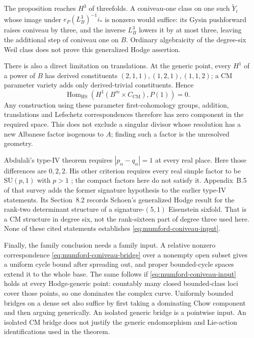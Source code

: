 \documentclass[11pt]{article}
\theoremstyle{definition}
\theoremstyle{remark}
\begin{document}
The proposition reaches $H^3$ of threefolds.  A coniveau-one class
on one such $\widetilde Y_i$ whose image under
$e_P(L_B^3)^{-1}i_*$ is nonzero would suffice: its Gysin
pushforward raises coniveau by three, and the inverse $L_B^3$
lowers it by at most three, leaving the additional step of
coniveau one on $B$.  Ordinary algebraicity of the degree-six
Weil class does not prove this generalized Hodge assertion.

There is also a direct limitation on translations.  At the generic
point, every $H^1$ of a power of $B$ has derived constituents
$(2,1,1),(1,2,1),(1,1,2)$; a CM parameter variety adds only
derived-trivial constituents.  Hence
\[
 \operatorname{Hom}_{\mathrm{HS}}
   (H^1(B^m\times C_{\mathrm{CM}}),P(1))=0.
\]
Any construction using these parameter first-cohomology groups,
addition, translations and Lefschetz correspondences therefore
has zero component in the required space.  This does not exclude
a singular divisor whose resolution has a new Albanese factor
isogenous to $A$; finding such a factor is the unresolved geometry.

Abdulali's type-IV theorem \cite[Theorem~13]{AbdulaliIV} requires
$|p_\alpha-q_\alpha|=1$ at every real place.  Here those differences
are $0,2,2$.  His other criterion requires every real simple factor
to be $\mathrm{SU}(p,1)$ with $p>1$
\cite[Theorems~6.5--6.6]{AbdulaliSurvey}; the compact factors here
do not satisfy it.  Appendix~B.5 of that survey adds the former
signature hypothesis to the earlier type-IV statements.
Its Section~8.2 records Schoen's generalized Hodge result for the
rank-two determinant structure of a signature-$(5,1)$ Eisenstein
sixfold.  That is a CM structure in degree six, not the rank-sixteen
part of degree three used here.  None of these cited statements
establishes \eqref{eq:mumford-coniveau-input}.

Finally, the family conclusion needs a family input.  A relative
nonzero correspondence \eqref{eq:mumford-coniveau-bridge} over a
nonempty open subset gives a uniform cycle bound after spreading
out, and proper bounded-cycle spaces extend it to the whole base.
The same follows if \eqref{eq:mumford-coniveau-input} holds at every
Hodge-generic point: countably many closed bounded-class loci cover
those points, so one dominates the complex curve.  Uniformly
bounded bridges on a dense set also suffice by first taking a
dominating Chow component and then arguing generically.
An isolated generic bridge is a pointwise input.  An isolated CM
bridge does not justify the generic endomorphism and Lie-action
identifications used in the theorem.
\end{document}
